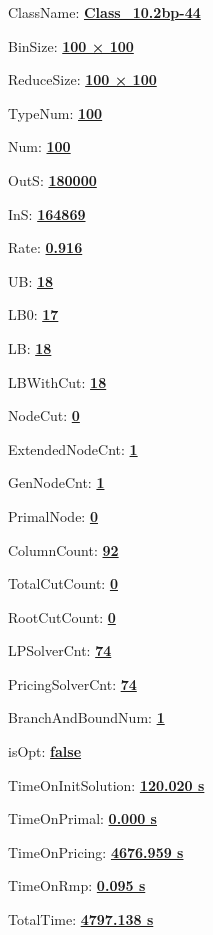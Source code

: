 \documentclass[11pt]{article}
\begin{document}
\pagestyle{empty}


ClassName: \underline{\textbf{Class_10.2bp-44}}
\par
BinSize: \underline{\textbf{100 × 100}}
\par
ReduceSize: \underline{\textbf{100 × 100}}
\par
TypeNum: \underline{\textbf{100}}
\par
Num: \underline{\textbf{100}}
\par
OutS: \underline{\textbf{180000}}
\par
InS: \underline{\textbf{164869}}
\par
Rate: \underline{\textbf{0.916}}
\par
UB: \underline{\textbf{18}}
\par
LB0: \underline{\textbf{17}}
\par
LB: \underline{\textbf{18}}
\par
LBWithCut: \underline{\textbf{18}}
\par
NodeCut: \underline{\textbf{0}}
\par
ExtendedNodeCnt: \underline{\textbf{1}}
\par
GenNodeCnt: \underline{\textbf{1}}
\par
PrimalNode: \underline{\textbf{0}}
\par
ColumnCount: \underline{\textbf{92}}
\par
TotalCutCount: \underline{\textbf{0}}
\par
RootCutCount: \underline{\textbf{0}}
\par
LPSolverCnt: \underline{\textbf{74}}
\par
PricingSolverCnt: \underline{\textbf{74}}
\par
BranchAndBoundNum: \underline{\textbf{1}}
\par
isOpt: \underline{\textbf{false}}
\par
TimeOnInitSolution: \underline{\textbf{120.020 s}}
\par
TimeOnPrimal: \underline{\textbf{0.000 s}}
\par
TimeOnPricing: \underline{\textbf{4676.959 s}}
\par
TimeOnRmp: \underline{\textbf{0.095 s}}
\par
TotalTime: \underline{\textbf{4797.138 s}}
\par
\newpage


\end{document}
